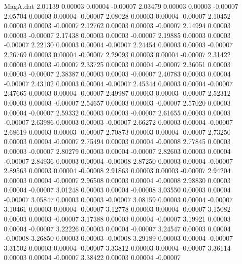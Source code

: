 \begin{filecontents}{MagA.dat}
   2.01139    0.00003    0.00004   -0.00007
   2.03479    0.00003    0.00003   -0.00007
   2.05704    0.00003    0.00004   -0.00007
   2.08028    0.00003    0.00004   -0.00007
   2.10452    0.00003    0.00003   -0.00007
   2.12762    0.00003    0.00003   -0.00007
   2.14994    0.00003    0.00003   -0.00007
   2.17438    0.00003    0.00003   -0.00007
   2.19885    0.00003    0.00003   -0.00007
   2.22130    0.00003    0.00004   -0.00007
   2.24454    0.00003    0.00003   -0.00007
   2.26769    0.00003    0.00004   -0.00007
   2.29093    0.00003    0.00004   -0.00007
   2.31422    0.00003    0.00003   -0.00007
   2.33725    0.00003    0.00004   -0.00007
   2.36051    0.00003    0.00003   -0.00007
   2.38387    0.00003    0.00003   -0.00007
   2.40783    0.00003    0.00004   -0.00007
   2.43102    0.00003    0.00004   -0.00007
   2.45344    0.00003    0.00004   -0.00007
   2.47665    0.00003    0.00004   -0.00007
   2.49987    0.00003    0.00003   -0.00007
   2.52312    0.00003    0.00003   -0.00007
   2.54657    0.00003    0.00003   -0.00007
   2.57020    0.00003    0.00004   -0.00007
   2.59332    0.00003    0.00003   -0.00007
   2.61655    0.00003    0.00003   -0.00007
   2.63986    0.00003    0.00003   -0.00007
   2.66272    0.00003    0.00004   -0.00007
   2.68619    0.00003    0.00003   -0.00007
   2.70873    0.00003    0.00004   -0.00007
   2.73250    0.00003    0.00004   -0.00007
   2.75494    0.00003    0.00004   -0.00008
   2.77845    0.00003    0.00003   -0.00007
   2.80279    0.00003    0.00004   -0.00007
   2.82603    0.00003    0.00004   -0.00007
   2.84936    0.00003    0.00004   -0.00008
   2.87250    0.00003    0.00004   -0.00007
   2.89563    0.00003    0.00004   -0.00008
   2.91863    0.00003    0.00003   -0.00007
   2.94204    0.00003    0.00004   -0.00007
   2.96508    0.00003    0.00004   -0.00008
   2.98830    0.00003    0.00004   -0.00007
   3.01248    0.00003    0.00004   -0.00008
   3.03550    0.00003    0.00004   -0.00007
   3.05847    0.00003    0.00003   -0.00007
   3.08159    0.00003    0.00004   -0.00007
   3.10461    0.00003    0.00004   -0.00007
   3.12778    0.00003    0.00004   -0.00007
   3.15082    0.00003    0.00003   -0.00007
   3.17388    0.00003    0.00004   -0.00007
   3.19921    0.00003    0.00004   -0.00007
   3.22226    0.00003    0.00004   -0.00007
   3.24547    0.00003    0.00004   -0.00008
   3.26850    0.00003    0.00003   -0.00008
   3.29189    0.00003    0.00004   -0.00007
   3.31502    0.00003    0.00004   -0.00007
   3.33812    0.00003    0.00004   -0.00007
   3.36114    0.00003    0.00004   -0.00007
   3.38422    0.00003    0.00004   -0.00007

\end{filecontents}
